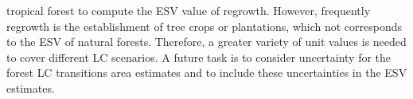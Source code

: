 tropical forest to compute the \ac{ESV} value of regrowth. However, frequently regrowth is the establishment of tree crops or plantations, which not corresponds to the \ac{ESV} of natural forests. Therefore, a greater variety of unit values is needed to cover different \ac{LC} scenarios. A future task is to consider uncertainty for the forest \ac{LC} transitions area estimates and to include these uncertainties in the \ac{ESV} estimates. 